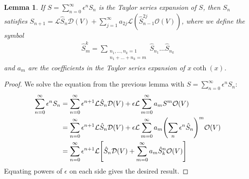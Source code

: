 \documentclass[11pt]{article}
\newtheorem{lem}{Lemma}
\begin{document}
\begin{lem}
    If $S = \sum_{n=0}^\infty\epsilon^n S_n$ is the Taylor series expansion of $S$, then $S_n$ satisfies $S_{n+1} = \mathcal L \hat S_n \mathcal D(V) + \sum_{j=1}^\infty a_{2j}\mathcal L(\hat S^{2j}_{n-1}\mathcal O(V))$, where we define the symbol
    \begin{align}
        \hat S^k_m = \sum_{\substack{n_1, \dots, n_k=1 \\ n_1 + \dots + n_k = m}}\hat S_{n_1}\dots \hat S_{n_k}
    \end{align}
    and $a_m$ are the coefficients in the Taylor series expansion of $x\coth(x)$. 
\end{lem}

\begin{proof}
    We solve the equation from the previous lemma with $S = \sum_{n=0}^\infty \epsilon^n S_n$:
\begin{align}
        \sum_{n=0}^\infty\epsilon^n S_n &=
        \sum_{n=0}^\infty \epsilon^{n+1}\mathcal L\hat S_n \mathcal D(V) + \epsilon\mathcal L \sum_{m=0}^\infty a_mS^m\mathcal O(V) \\
                                        &= \sum_{n=0}^\infty \epsilon^{n+1}\mathcal L\hat S_n \mathcal D(V) + \epsilon\mathcal L \sum_{m=0}^\infty a_m\qty(\sum_{n}\epsilon^n \hat S_n)^m\mathcal O(V) \\
                                        &= \sum_{n=0}^\infty \epsilon^{n+1}\mathcal L\qty[\hat S_n \mathcal D(V) + \sum_{m=0}^\infty a_m\hat S_k^n\mathcal O(V)]
\end{align}
Equating powers of $\epsilon$ on each side gives the desired result.
\end{proof}
\end{document}
